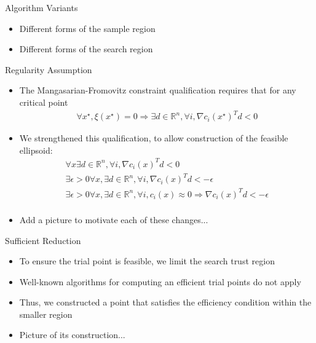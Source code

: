 \documentclass{beamer}
\newcommand{\Rn}{\mathbb R ^ {n}}
\begin{document}
\begin{frame}{Algorithm Variants}

\begin{itemize}
	\item Different forms of the sample region
	\item Different forms of the search region
\end{itemize}
\end{frame}


\begin{frame}{Regularity Assumption}
\begin{itemize}
\item The Mangasarian-Fromovitz constraint qualification requires that for any critical point 
\begin{align*}
\forall x^{\star}, \xi\left(x^{\star}\right) = 0 
\Longrightarrow \exists d \in \Rn, \forall i, \nabla c_i\left(x^{\star}\right)^T d < 0 
\end{align*}
\item We strengthened this qualification, to allow construction of the feasible ellipsoid:
\begin{align*}
\forall x \exists d \in \Rn, \forall i, \nabla c_i\left(x\right)^T d < 0 \\
\exists \epsilon>0 \forall x, \exists d \in \Rn, \forall i, \nabla c_i\left(x\right)^T d < -\epsilon \\
\exists \epsilon>0 \forall x,\exists d\in \Rn, \forall i, c_i\left(x\right) \approx 0
\Longrightarrow \nabla c_i\left(x\right)^T d < -\epsilon \\
\end{align*}
\color{red}
\item Add a picture to motivate each of these changes...
\color{black}
\end{itemize}
\end{frame}



\begin{frame}{Sufficient Reduction}
\begin{itemize}
\item To ensure the trial point is feasible, we limit the search trust region
\item Well-known algorithms for computing an efficient trial points do not apply
\item Thus, we constructed a point that satisfies the efficiency condition within the smaller region
\color{red}
\item Picture of its construction...
\color{black}
\end{itemize}
\end{frame}
\end{document}
